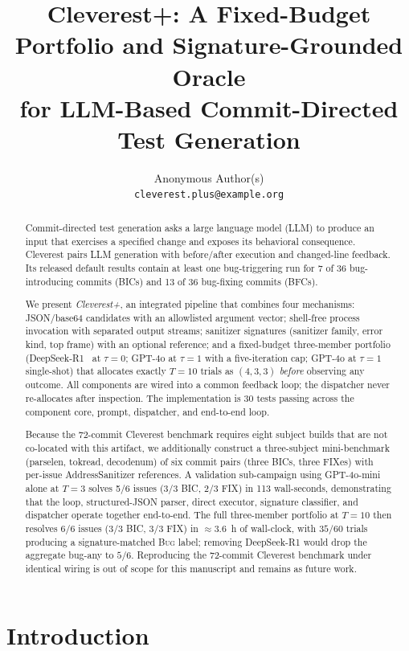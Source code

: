 \documentclass{article}
\title{Cleverest+: A Fixed-Budget Portfolio and Signature-Grounded Oracle\\
for LLM-Based Commit-Directed Test Generation}
\author{%
Anonymous Author(s)\\
\texttt{cleverest.plus@example.org}
}
\begin{document}
\maketitle

\begin{abstract}
Commit-directed test generation asks a large language model (LLM) to produce an
input that exercises a specified change and exposes its behavioral consequence.
Cleverest pairs LLM generation with before/after execution and changed-line
feedback.  Its released default results contain at least one bug-triggering run
for 7 of 36 bug-introducing commits (BICs) and 13 of 36 bug-fixing commits
(BFCs).

We present \emph{Cleverest+}, an integrated pipeline that combines four
mechanisms: JSON/base64 candidates with an allowlisted argument vector;
shell-free process invocation with separated output streams; sanitizer
signatures (sanitizer family, error kind, top frame) with an optional
reference; and a fixed-budget three-member portfolio (DeepSeek-R1~\cite{deepseekr1}
at $\tau{=}0$; GPT-4o at $\tau{=}1$ with a five-iteration cap; GPT-4o at
$\tau{=}1$ single-shot) that allocates exactly $T{=}10$ trials as $(4,3,3)$
\emph{before} observing any outcome.  All components are wired into a common
feedback loop; the dispatcher never re-allocates after inspection.  The
implementation is 30 tests passing across the component core, prompt,
dispatcher, and end-to-end loop.

Because the 72-commit Cleverest benchmark requires eight subject builds that
are not co-located with this artifact, we additionally construct a three-subject
mini-benchmark (parselen, tokread, decodenum) of six commit pairs (three
BICs, three FIXes) with per-issue AddressSanitizer references. A validation
sub-campaign using GPT-4o-mini alone at $T{=}3$ solves 5/6 issues (3/3 BIC,
2/3 FIX) in 113 wall-seconds, demonstrating that the loop, structured-JSON
parser, direct executor, signature classifier, and dispatcher operate together
end-to-end. The full three-member portfolio at $T{=}10$ then resolves $6/6$
issues (3/3 BIC, 3/3 FIX) in $\approx 3.6$~h of wall-clock, with $35/60$
trials producing a signature-matched \textsc{Bug} label; removing DeepSeek-R1
would drop the aggregate bug-any to $5/6$.  Reproducing the 72-commit
Cleverest benchmark under identical wiring is out of scope for this
manuscript and remains as future work.
\end{abstract}

\section{Introduction}
\label{sec:intro}
\end{document}
